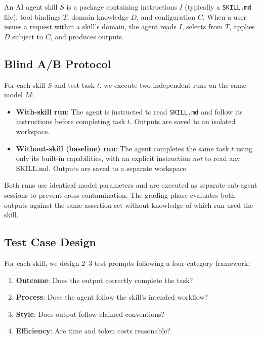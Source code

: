 \documentclass[11pt,a4paper]{article}
\begin{document}
An AI agent skill $S$ is a package containing instructions $I$ (typically a \texttt{SKILL.md} file), tool bindings $T$, domain knowledge $D$, and configuration $C$. When a user issues a request within a skill's domain, the agent reads $I$, selects from $T$, applies $D$ subject to $C$, and produces outputs.

\subsection{Blind A/B Protocol}
\label{sec:protocol}

For each skill $S$ and test task $t$, we execute two independent runs on the same model $M$:

\begin{itemize}[leftmargin=*]
    \item \textbf{With-skill run}: The agent is instructed to read \texttt{SKILL.md} and follow its instructions before completing task $t$. Outputs are saved to an isolated workspace.
    \item \textbf{Without-skill (baseline) run}: The agent completes the same task $t$ using only its built-in capabilities, with an explicit instruction \emph{not} to read any SKILL.md. Outputs are saved to a separate workspace.
\end{itemize}

Both runs use identical model parameters and are executed as separate sub-agent sessions to prevent cross-contamination. The grading phase evaluates both outputs against the same assertion set without knowledge of which run used the skill.

\subsection{Test Case Design}

For each skill, we design 2--3 test prompts following a four-category framework:

\begin{enumerate}[leftmargin=*]
    \item \textbf{Outcome}: Does the output correctly complete the task?
    \item \textbf{Process}: Does the agent follow the skill's intended workflow?
    \item \textbf{Style}: Does output follow claimed conventions?
    \item \textbf{Efficiency}: Are time and token costs reasonable?
\end{enumerate}
\end{document}
